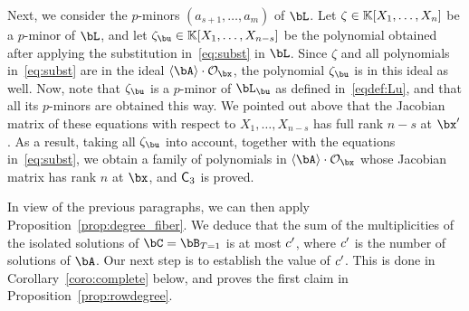 \documentclass[12pt]{article}
\begin{document}
Next, we consider the $p$-minors $(a_{s+1},\dots,a_m)$ of $\bL$. Let
$\zeta \in\mathbb{K}[X_1,\dots,X_n]$ be a $p$-minor of $\bL$, and let
$\zeta_\bu \in \KK[X_1,\dots,X_{n-s}]$ be the polynomial obtained
after applying the substitution in~\eqref{eq:subst} in $\bL$. Since
$\zeta$ and all polynomials in~\eqref{eq:subst} are in the ideal
$\langle \bA \rangle \cdot \mathcal{O}_\bx$, the polynomial
$\zeta_\bu$ is in this ideal as well. Now, note that $\zeta_\bu$ is a
$p$-minor of $\bL_\bu$ as defined in~\eqref{eqdef:Lu}, and that all
its $p$-minors are obtained this way. We pointed out above that the
Jacobian matrix of these equations with respect to $X_1,\dots,X_{n-s}$
has full rank $n-s$ at $\bx'$. As a result, taking all $\zeta_\bu$ into account,
together with the equations in~\eqref{eq:subst}, we obtain 
a family of polynomials in $\langle \bA \rangle \cdot \mathcal{O}_\bx$ 
whose Jacobian matrix has rank $n$ at $\bx$, and $\mathsf{C}_3$ is proved.

\medskip

In view of the previous paragraphs, we can then apply
Proposition~\ref{prop:degree_fiber}. We deduce that the sum of the
multiplicities of the isolated solutions of $\bC=\bB_{T=1}$ is at most
${c'}{}$, where ${c'}{}$ is the number of solutions of $\bA$. Our next step
is to establish the value of ${c'}{}$. This is done in
Corollary~\ref{coro:complete} below, and proves the first claim in
Proposition~\ref{prop:rowdegree}.
\end{document}
